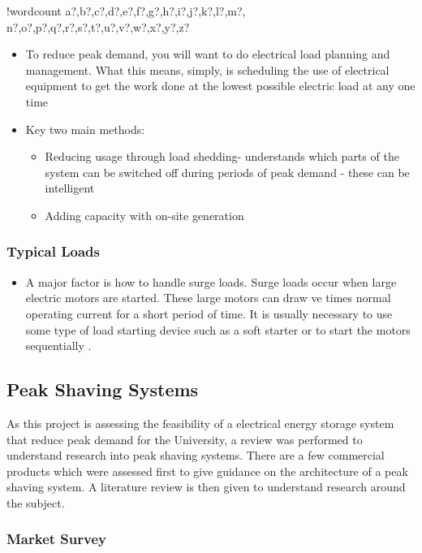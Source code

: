 \documentclass[10pt]{article}
\providecommand{\tightlist}{%
  \setlength{\itemsep}{0pt}\setlength{\parskip}{0pt}}
\newcounter{words}
\newenvironment{counted}{%
  \setcounter{words}{0}
  \SearchList!{wordcount}{\stepcounter{words}}
    {a?,b?,c?,d?,e?,f?,g?,h?,i?,j?,k?,l?,m?,
    n?,o?,p?,q?,r?,s?,t?,u?,v?,w?,x?,y?,z?}
  \UndoBoundary{'}
  \SearchOrder{p;}}{%
  \StopSearching}
\begin{document}
\begin{counted}
\begin{itemize}
\tightlist
\item
  To reduce peak demand, you will want to do electrical load planning
  and management. What this means, simply, is scheduling the use of
  electrical equipment to get the work done at the lowest possible
  electric load at any one time \cite{Reducing37:online}
\item
  Key two main methods:

  \begin{itemize}
  \tightlist
  \item
    Reducing usage through load shedding- understands which parts of the
    system can be switched off during periods of peak demand - these can
    be intelligent \cite{6199851}
  \item
    Adding capacity with on-site generation \cite{schneiderRECPS}
  \end{itemize}
\end{itemize}

\subsubsection{Typical Loads}\label{typical-loads}

\begin{itemize}
\tightlist
\item
  A major factor is how to handle surge loads. Surge loads occur when
  large electric motors are started. These large motors can draw ve
  times normal operating current for a short period of time. It is
  usually necessary to use some type of load starting device such as a
  soft starter or to start the motors sequentially \cite{baldorPS}.
\end{itemize}

\subsection{Peak Shaving Systems}\label{peak-shaving-systems}

As this project is assessing the feasibility of a electrical energy
storage system that reduce peak demand for the University, a review was
performed to understand research into peak shaving systems. There are a
few commercial products which were assessed first to give guidance on
the architecture of a peak shaving system. A literature review is then
given to understand research around the subject.

\subsubsection{Market Survey}\label{market-survey}


\end{counted}
\end{document}
